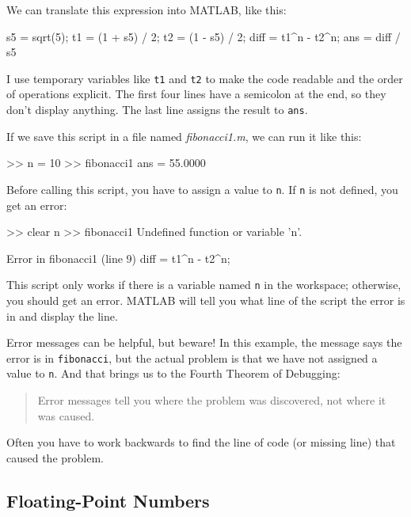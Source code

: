 \documentclass[../../book.tex]{subfiles}
\begin{document}
We can translate this expression into MATLAB, like this:

\begin{code}
s5 = sqrt(5);
t1 = (1 + s5) / 2;
t2 = (1 - s5) / 2;
diff = t1^n - t2^n;
ans = diff / s5
\end{code}

I use temporary variables like \lstinline{t1} and \lstinline{t2} to make the code readable and the order of operations explicit.  The first four lines have a semicolon at the end, so they don't display anything.  The last line assigns the result to \lstinline{ans}.


If we save this script in a file named \emph{fibonacci1.m}, we can run it like this:

\begin{code}
>> n = 10
>> fibonacci1
ans = 55.0000
\end{code}

Before calling this script, you have to assign a value to \lstinline{n}.
If \lstinline{n} is not defined, you get an error:

\begin{code}
>> clear n
>> fibonacci1
Undefined function or variable 'n'.

Error in fibonacci1 (line 9)
diff = t1^n - t2^n;
\end{code}

This script only works if there is a variable named \lstinline{n} in the workspace; otherwise, you should get an error.
MATLAB will tell you what line of the script the error is in and display the line.



Error messages can be helpful, but beware!
In this example, the message says the error is in \lstinline{fibonacci}, but the actual problem is that we have not assigned a value to \lstinline{n}.
And that brings us to the Fourth Theorem of Debugging:

\begin{quote}
Error messages tell you where the problem was discovered,
not where it was caused.
\end{quote}

Often you have to work backwards to find the line of code (or missing line) that caused the problem.

\subsection{Floating-Point Numbers}
\end{document}
